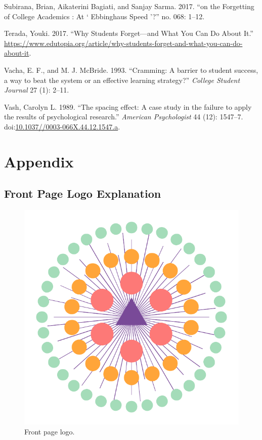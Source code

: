 \hypertarget{ref-Subirana2017}{}
Subirana, Brian, Aikaterini Bagiati, and Sanjay Sarma. 2017. ``on the
Forgetting of College Academics : At ` Ebbinghaus Speed '?'' no. 068:
1--12.

\hypertarget{ref-Tereda2017}{}
Terada, Youki. 2017. ``Why Students Forget---and What You Can Do About
It.''
\url{https://www.edutopia.org/article/why-students-forget-and-what-you-can-do-about-it}.

\hypertarget{ref-Vacha1993}{}
Vacha, E. F., and M. J. McBride. 1993. ``Cramming: A barrier to student
success, a way to beat the system or an effective learning strategy?''
\emph{College Student Journal} 27 (1): 2--11.

\hypertarget{ref-Vash1989}{}
Vash, Carolyn L. 1989. ``The spacing effect: A case study in the failure
to apply the results of psychological research.'' \emph{American
Psychologist} 44 (12): 1547--7.
doi:\href{https://doi.org/10.1037//0003-066X.44.12.1547.a}{10.1037//0003-066X.44.12.1547.a}.

\newpage

\appendix

\section{Appendix}\label{appendix}

\subsection{Front Page Logo
Explanation}\label{front-page-logo-explanation}

\begin{figure}
\centering
\includegraphics{assets/logo.pdf}
\caption{Front page logo.}
\end{figure}

